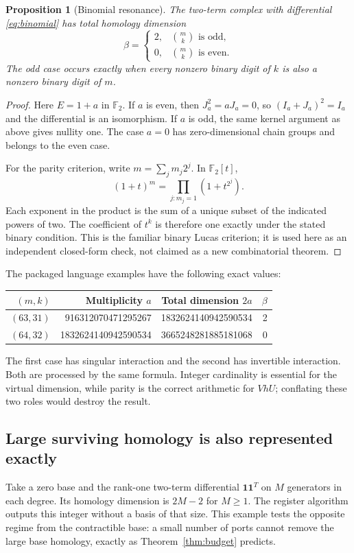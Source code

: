 \documentclass[11pt,letterpaper]{article}
\newcommand{\F}{{\mathbb F_2}}
\newcommand{\one}{\mathbf 1}
\newtheorem{proposition}[theorem]{Proposition}
\theoremstyle{definition}
\theoremstyle{remark}
\numberwithin{equation}{section}
\begin{document}
\begin{proposition}[Binomial resonance]
\label{prop:binomial}
The two-term complex with differential \eqref{eq:binomial} has total
homology dimension
\begin{equation}
 \beta=\begin{cases}2,&\binom mk\text{ is odd},\\0,&\binom mk\text{ is even}.
 \end{cases}
 \label{eq:binomialbeta}
\end{equation}
The odd case occurs exactly when every nonzero binary digit of $k$ is
also a nonzero binary digit of $m$.
\end{proposition}
\begin{proof}
Here $E=1+a$ in $\F$. If $a$ is even, then $J_a^2=aJ_a=0$, so
$(I_a+J_a)^2=I_a$ and the differential is an isomorphism. If $a$ is odd,
the same kernel argument as above gives nullity one. The case $a=0$
has zero-dimensional chain groups and belongs to the even case.

For the parity criterion, write $m=\sum_jm_j2^j$. In $\F[t]$,
\[
 (1+t)^m=\prod_{j:m_j=1}(1+t^{2^j}).
\]
Each exponent in the product is the sum of a unique subset of the
indicated powers of two. The coefficient of $t^k$ is therefore one
exactly under the stated binary condition. This is the familiar binary
Lucas criterion; it is used here as an independent closed-form check,
not claimed as a new combinatorial theorem.
\end{proof}

The packaged language examples have the following exact values:
\begin{center}
\begin{tabular}{rrrr}
\toprule
$(m,k)$ & Multiplicity $a$ & Total dimension $2a$ & $\beta$\\
\midrule
$(63,31)$ & 916312070471295267 & 1832624140942590534 & 2\\
$(64,32)$ & 1832624140942590534 & 3665248281885181068 & 0\\
\bottomrule
\end{tabular}
\end{center}
The first case has singular interaction and the second has invertible
interaction. Both are processed by the same formula. Integer cardinality
is essential for the virtual dimension, while parity is the correct
arithmetic for $VhU$; conflating these two roles would destroy the result.

\subsection{Large surviving homology is also represented exactly}
Take a zero base and the rank-one two-term differential $\one\one^T$ on
$M$ generators in each degree. Its homology dimension is $2M-2$ for
$M\ge1$. The register algorithm outputs this integer without a basis of
that size. This example tests the opposite regime from the contractible
base: a small number of ports cannot remove the large base homology,
exactly as Theorem~\ref{thm:budget} predicts.
\end{document}
